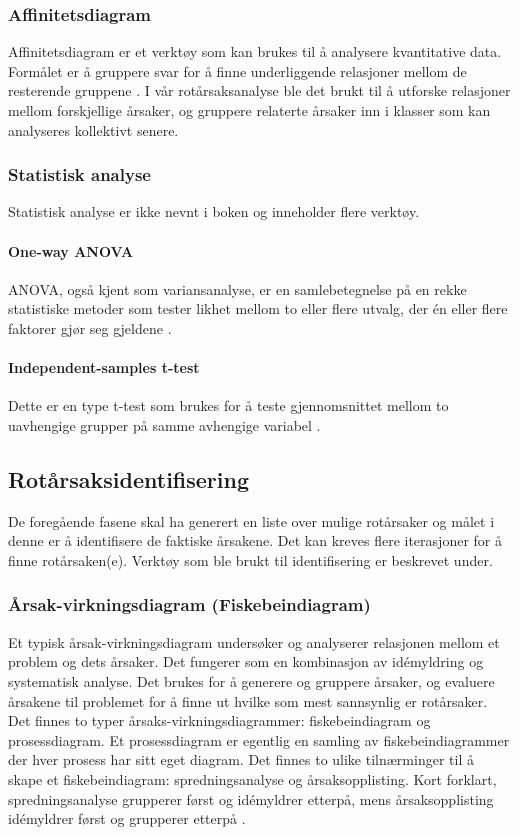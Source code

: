 \subsubsection{Affinitetsdiagram}
Affinitetsdiagram er et verktøy som kan brukes til å analysere kvantitative data. Formålet er å gruppere svar for å finne underliggende relasjoner mellom de resterende gruppene \cite{RCA}. I vår rotårsaksanalyse ble det brukt til å utforske relasjoner mellom forskjellige årsaker, og gruppere relaterte årsaker inn i klasser som kan analyseres kollektivt senere. 

\subsubsection{Statistisk analyse}
Statistisk analyse er ikke nevnt i boken \cite{RCA} og inneholder flere verktøy. 
\paragraph{One-way ANOVA} ANOVA, også kjent som variansanalyse, er en samlebetegnelse på en rekke statistiske metoder som tester likhet mellom to eller flere utvalg, der én eller flere faktorer gjør seg gjeldene \cite{ANOVA}. 
\paragraph{Independent-samples t-test} Dette er en type t-test som brukes for å teste gjennomsnittet mellom to uavhengige grupper på samme avhengige variabel \cite{t-test}.

\subsection{Rotårsaksidentifisering}
De foregående fasene skal ha generert en liste over mulige rotårsaker og målet i denne er å identifisere de faktiske årsakene. Det kan kreves flere iterasjoner for å finne rotårsaken(e). Verktøy som ble brukt til identifisering er beskrevet under. 

\subsubsection{Årsak-virkningsdiagram (Fiskebeindiagram)}
Et typisk årsak-virkningsdiagram undersøker og analyserer relasjonen mellom et problem og dets årsaker. Det fungerer som en kombinasjon av idémyldring og systematisk analyse. Det brukes for å generere og gruppere årsaker, og evaluere årsakene til problemet for å finne ut hvilke som mest sannsynlig er rotårsaker. Det finnes to typer årsaks-virkningsdiagrammer: fiskebeindiagram og prosessdiagram. Et prosessdiagram er egentlig en samling av fiskebeindiagrammer der hver prosess har sitt eget diagram. Det finnes to ulike tilnærminger til å skape et fiskebeindiagram: spredningsanalyse og årsaksopplisting. Kort forklart, spredningsanalyse grupperer først og idémyldrer etterpå, mens årsaksopplisting idémyldrer først og grupperer etterpå \cite{RCA}. 

